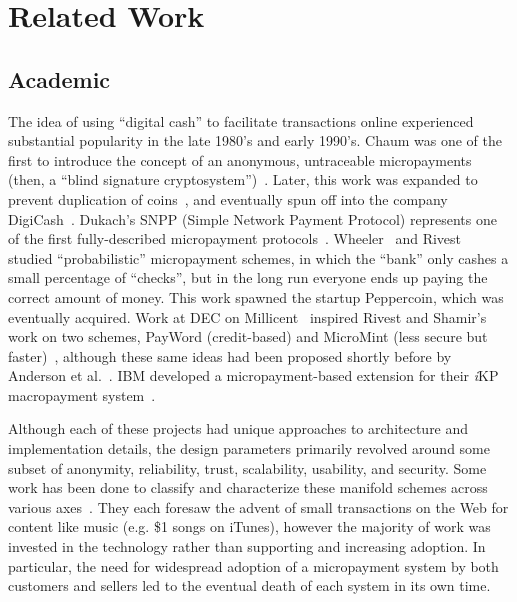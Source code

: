 \section{Related Work}

\subsection{Academic}\label{academic_related}
The idea of using ``digital cash'' to facilitate transactions online experienced substantial popularity in the late 1980's and early 1990's.
Chaum was one of the first to introduce the concept of an anonymous, untraceable micropayments (then, a ``blind signature cryptosystem'')~\cite{chaum1983blind}.
Later, this work was expanded to prevent duplication of coins~\cite{chaum1990untraceable}, and eventually spun off into the company DigiCash~\cite{schoenmakers1998security}.
Dukach's SNPP (Simple Network Payment Protocol) represents one of the first fully-described micropayment protocols~\cite{dukach1992snpp}.
Wheeler~\cite{wheeler1997transactions} and Rivest~\cite{rivest1997electronic} studied ``probabilistic'' micropayment schemes, in which the ``bank'' only cashes a small percentage of ``checks'', but in the long run everyone ends up paying the correct amount of money.
This work spawned the startup Peppercoin, which was eventually acquired.
Work at DEC on Millicent~\cite{manasse1995millicent} inspired Rivest and Shamir's work on two schemes, PayWord (credit-based) and MicroMint (less secure but faster)~\cite{rivest1997payword}, although these same ideas had been proposed shortly before by Anderson et al.~\cite{anderson1997netcard}.
IBM developed a micropayment-based extension for their \textit{i}KP macropayment system~\cite{hauser1996micro}.

Although each of these projects had unique approaches to architecture and implementation details, the design parameters primarily revolved around some subset of anonymity, reliability, trust, scalability, usability, and security. Some work has been done to classify and characterize these manifold schemes across various axes~\cite{abrazhevich2001classification,parhonyi2005second,parhonyi2006fall}. They each foresaw the advent of small transactions on the Web for content like music (e.g. \$1 songs on iTunes), however the majority of work was invested in the technology rather than supporting and increasing adoption. In particular, the need for widespread adoption of a micropayment system by both customers and sellers led to the eventual death of each system in its own time.

